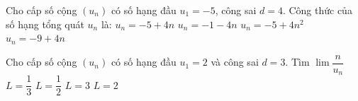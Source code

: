 

\begin{ex}%
	Cho cấp số cộng $\left(u_n\right)$ có số hạng đầu $u_1=-5$, công sai $d=4$. Công thức của số hạng  tổng quát $u_n$ là:
	 \choice
		 {$u_n=-5+4n$}
		 {$u_n=-1-4n$}
		{$u_n=-5+4n^2$} 
		{\True  $u_n=-9+4n$}
\end{ex}

\begin{ex}%
	Cho cấp số cộng $\left(u_n \right)$ có số hạng đầu $u_1=2$ và công sai $d=3$. Tìm $\lim\dfrac{n}{u_n}$ 
	\choice 
		 {\True $L=\dfrac{1}{3}$}
		{$L=\dfrac{1}{2}$} 
		{$L=3$} 
		 {$L=2$}
\end{ex}
